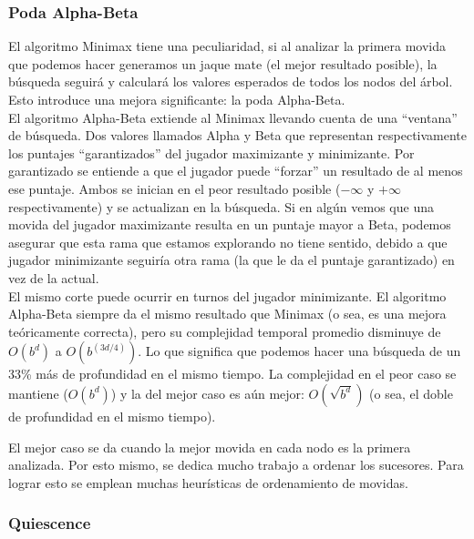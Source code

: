 \documentclass{article}
\begin{document}
\begin{multicols}{2}
\subsubsection{Poda Alpha-Beta}

El algoritmo Minimax tiene una peculiaridad, si al analizar la primera
movida que podemos hacer generamos un jaque mate (el mejor resultado
posible), la búsqueda seguirá y calculará los valores esperados de
todos los nodos del árbol. Esto introduce una mejora significante: la
poda Alpha-Beta.
\\

El algoritmo Alpha-Beta extiende al Minimax llevando cuenta de una
``ventana'' de búsqueda. Dos valores llamados Alpha y Beta que
representan respectivamente los puntajes ``garantizados'' del jugador
maximizante y minimizante. Por garantizado se entiende a que el jugador
puede ``forzar'' un resultado de al menos ese puntaje. Ambos se inician
en el peor resultado posible ($-\infty$ y $+\infty$ respectivamente)
y se actualizan en la búsqueda. Si en algún vemos que una movida
del jugador maximizante resulta en un puntaje mayor a Beta, podemos
asegurar que esta rama que estamos explorando no tiene sentido, debido
a que jugador minimizante seguiría otra rama (la que le da el puntaje
garantizado) en vez de la actual.
\\

El mismo corte puede ocurrir en turnos del jugador minimizante. El
algoritmo Alpha-Beta siempre da el mismo resultado que Minimax (o sea,
es una mejora teóricamente correcta), pero su complejidad temporal
promedio disminuye de $O(b^d)$ a $O(b^{(3d/4)})$\footnotemark. Lo
que significa que podemos hacer una búsqueda de un 33\% más de
profundidad en el mismo tiempo. La complejidad en el peor caso se
mantiene ($O(b^d)$) y la del mejor caso es aún mejor: $O(\sqrt{b^d})$
(o sea, el doble de profundidad en el mismo tiempo).
\\


El mejor caso se da cuando la mejor movida en cada nodo es la
primera analizada. Por esto mismo, se dedica mucho trabajo a ordenar
los sucesores. Para lograr esto se emplean muchas heurísticas de
ordenamiento de movidas.
\\

\subsubsection{Quiescence}


\end{multicols}
\end{document}
